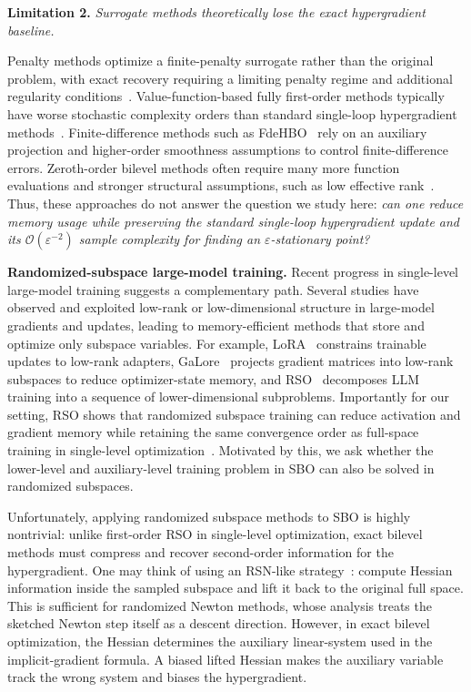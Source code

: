 \documentclass{pkumelon}
\newenvironment{limbox}{\begin{limitationbox}}{\end{limitationbox}}
\theoremstyle{plain}
\begin{document}
\begin{limbox}
\textbf{Limitation 2. }\emph{Surrogate methods theoretically lose the exact hypergradient baseline.}
\end{limbox}

Penalty methods optimize a finite-penalty surrogate rather than the original problem, with exact recovery requiring a limiting penalty regime and additional regularity conditions~\citep{mehra2021penalty,kwon2023penalty}. Value-function-based fully first-order methods typically have worse stochastic complexity orders than standard single-loop hypergradient methods~\citep{kwon2023fully}. Finite-difference methods such as FdeHBO~\citep{yang2023achieving} rely on an auxiliary projection and higher-order smoothness assumptions to control finite-difference errors. Zeroth-order bilevel methods often require many more function evaluations and stronger structural assumptions, such as low effective rank~\citep{shirkavand2025bilevel}. Thus, these approaches do not answer the question we study here: \emph{can one reduce memory usage while preserving the standard single-loop hypergradient update and its $\mathcal O(\varepsilon^{-2})$ sample complexity for finding an $\varepsilon$-stationary point?}

\textbf{Randomized-subspace large-model training. } Recent progress in single-level large-model training suggests a complementary path. Several studies have observed and exploited low-rank or low-dimensional structure in large-model gradients and updates, leading to memory-efficient methods that store and optimize only subspace variables. For example, LoRA~\citep{hu2022lora} constrains trainable updates to low-rank adapters, GaLore~\citep{zhao2024galore} projects gradient matrices into low-rank subspaces to reduce optimizer-state memory, and RSO~\citep{chen2025memory} decomposes LLM training into a sequence of lower-dimensional subproblems. Importantly for our setting, RSO shows that randomized subspace training can reduce activation and gradient memory while retaining the same convergence order as full-space training in single-level optimization~\citep{chen2025memory}. Motivated by this, we ask whether the lower-level and auxiliary-level training problem in SBO can also be solved in randomized subspaces.

Unfortunately, applying randomized subspace methods to SBO is highly nontrivial: unlike first-order RSO in single-level optimization, exact bilevel methods must compress and recover second-order information for the hypergradient. One may think of using an RSN-like strategy~\citep{gower2019rsn}: compute Hessian information inside the sampled subspace and lift it back to the original full space. This is sufficient for randomized Newton methods, whose analysis treats the sketched Newton step itself as a descent direction. However, in exact bilevel optimization, the Hessian determines the auxiliary linear-system used in the implicit-gradient formula. A biased lifted Hessian makes the auxiliary variable track the wrong system and biases the hypergradient.
\end{document}
